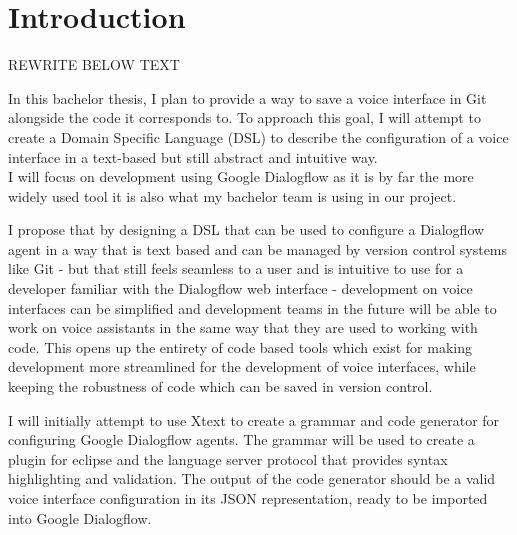 \chapter{Introduction}

REWRITE BELOW TEXT

In this bachelor thesis, I plan to provide a way to save a voice interface in Git alongside the code it corresponds to. To approach this goal, I will attempt to create a Domain Specific Language (DSL) to describe the configuration of a voice interface in a text-based but still abstract and intuitive way. \\
I will focus on development using Google Dialogflow as it is by far the more widely used tool it is also what my bachelor team is using in our project.

I propose that by designing a DSL that can be used to configure a Dialogflow agent in a way that is text based and can be managed by version control systems like Git - but that still feels seamless to a user and is intuitive to use for a developer familiar with the Dialogflow web interface - development on voice interfaces can be simplified and development teams in the future will be able to work on voice assistants in the same way that they are used to working with code. This opens up the entirety of code based tools which exist for making development more streamlined for the development of voice interfaces, while keeping the robustness of code which can be saved in version control.

I will initially attempt to use Xtext to create a grammar and code generator for configuring Google Dialogflow agents. The grammar will be used to create a plugin for eclipse and the language server protocol that provides syntax highlighting and validation. The output of the code generator should be a valid voice interface configuration in its JSON representation, ready to be imported into Google Dialogflow.

